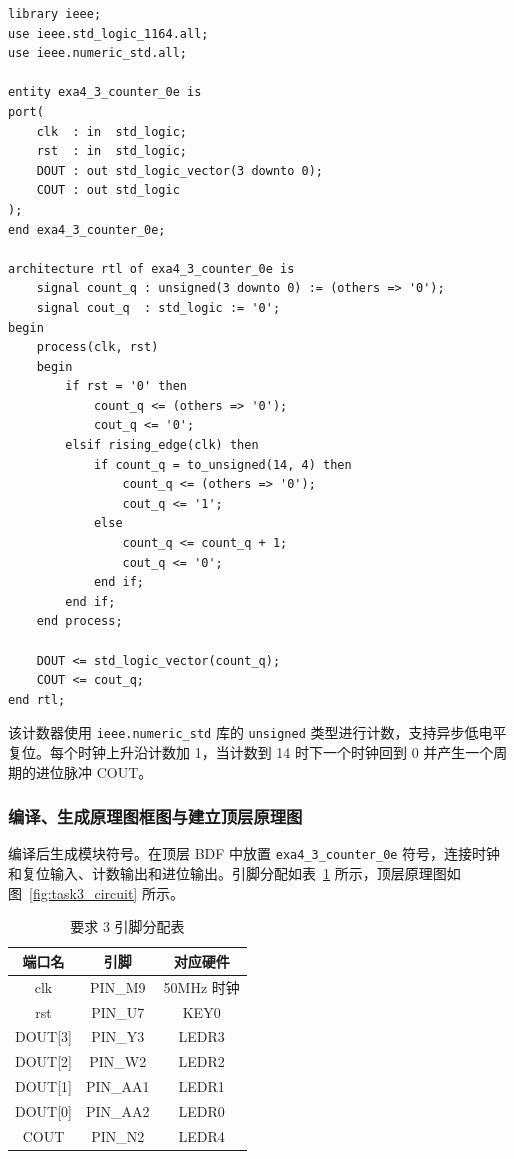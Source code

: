 \documentclass[12pt]{ctexart}
\begin{document}
\begin{verbatim}
library ieee;
use ieee.std_logic_1164.all;
use ieee.numeric_std.all;

entity exa4_3_counter_0e is
port(
    clk  : in  std_logic;
    rst  : in  std_logic;
    DOUT : out std_logic_vector(3 downto 0);
    COUT : out std_logic
);
end exa4_3_counter_0e;

architecture rtl of exa4_3_counter_0e is
    signal count_q : unsigned(3 downto 0) := (others => '0');
    signal cout_q  : std_logic := '0';
begin
    process(clk, rst)
    begin
        if rst = '0' then
            count_q <= (others => '0');
            cout_q <= '0';
        elsif rising_edge(clk) then
            if count_q = to_unsigned(14, 4) then
                count_q <= (others => '0');
                cout_q <= '1';
            else
                count_q <= count_q + 1;
                cout_q <= '0';
            end if;
        end if;
    end process;

    DOUT <= std_logic_vector(count_q);
    COUT <= cout_q;
end rtl;
\end{verbatim}
\label{lst:counter}

该计数器使用 \texttt{ieee.numeric\_std} 库的 \texttt{unsigned} 类型进行计数，支持异步低电平复位。每个时钟上升沿计数加 1，当计数到 14 时下一个时钟回到 0 并产生一个周期的进位脉冲 COUT。

\subsubsection{编译、生成原理图框图与建立顶层原理图}

编译后生成模块符号。在顶层 BDF 中放置 \texttt{exa4\_3\_counter\_0e} 符号，连接时钟和复位输入、计数输出和进位输出。引脚分配如表~\ref{tab:task3_pins} 所示，顶层原理图如图~\ref{fig:task3_circuit} 所示。

\begin{table}[H]
    \centering
    \caption{要求 3 引脚分配表}
    \label{tab:task3_pins}
    \begin{tabular}{ccc}
        \toprule
        \textbf{端口名} & \textbf{引脚} & \textbf{对应硬件} \\
        \midrule
        clk     & PIN\_M9  & 50MHz 时钟 \\
        rst     & PIN\_U7  & KEY0 \\
        DOUT[3] & PIN\_Y3  & LEDR3 \\
        DOUT[2] & PIN\_W2  & LEDR2 \\
        DOUT[1] & PIN\_AA1 & LEDR1 \\
        DOUT[0] & PIN\_AA2 & LEDR0 \\
        COUT    & PIN\_N2  & LEDR4 \\
        \bottomrule
    \end{tabular}
\end{table}
\end{document}

